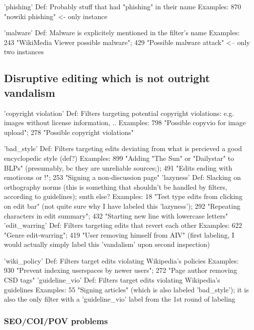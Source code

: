 'phishing'
  Def: Probably stuff that had "phishing" in their name
  Examples: 870 "nowiki phishing" <- only instance

'malware'
  Def: Malware is explicitely mentioned in the filter's name %
  Examples: 243 "WikiMedia Viewer possible malware"; 429 "Possible malware attack" <-- only two instances


\subsection{Disruptive editing which is not outright vandalism}

'copyright violation'
  Def: Filters targeting potential copyright violations: e.g. images without license information, ..
  Examples: 798 "Possible copyvio for image upload"; 278 "Possible copyright violations"

'bad\_style'
  Def: Filters targeting edits deviating from what is percieved a good encyclopedic style (def?)
  Examples: 899 "Adding "The Sun" or "Dailystar" to BLPs" (presumably, bc they are unreliable sources;); 491 "Edits ending with emoticons or !"; 253 "Signing a non-discussion page"
'lazyness'
  Def: Slacking on orthography norms (this is something that shouldn't be handled by filters, according to guidelines); smth else?
  Examples: 18 "Test type edits from clicking on edit bar" (not quite sure why I have labeled this 'lazyness'); 292 "Repeating characters in edit summary"; 432 "Starting new line with lowercase letters"
'edit\_warring'
  Def: Filters targeting edits that revert each other
  Examples: 622 "Genre edit-warring"; 419 "User removing himself from AIV" (first labeling, I would actually simply label this 'vandalism' upon second inspection)

'wiki\_policy'
  Def: Filters target edits violating Wikipedia's policies
  Examples: 930 "Prevent indexing userspaces by newer users"; 272 "Page author removing CSD tags"
'guideline\_vio'
  Def: Filters target edits violating Wikipedia's guidelines %
  Examples: 55 "Signing articles" (which is also labeled 'bad\_style'); it is also the only filter with a 'guideline\_vio' label from the 1st round of labeling

\subsubsection{SEO/COI/POV problems}

